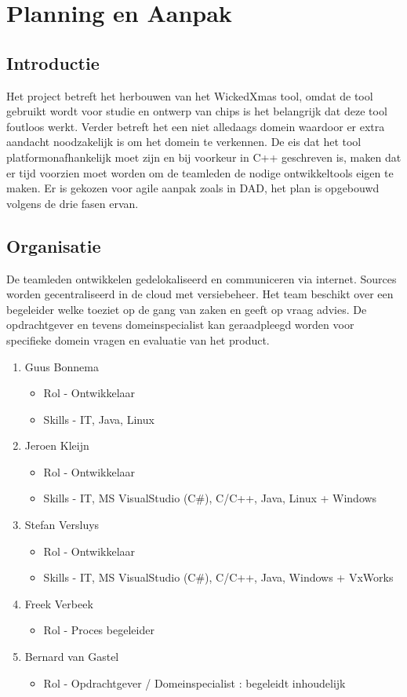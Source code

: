 
\section{Planning en Aanpak}
\subsection{Introductie}
Het project betreft het herbouwen van het WickedXmas tool, omdat de tool gebruikt wordt voor studie
en ontwerp van chips is het belangrijk dat deze tool foutloos werkt. Verder betreft het een niet
alledaags domein waardoor er extra aandacht noodzakelijk is om het domein te verkennen. De eis dat
het tool platformonafhankelijk moet zijn en bij voorkeur in C++ geschreven is,  maken dat er tijd
voorzien moet worden om de teamleden de nodige ontwikkeltools eigen te maken.
Er is gekozen voor agile aanpak zoals in DAD, het plan is opgebouwd volgens de
drie fasen ervan.

\subsection{Organisatie}
 De teamleden ontwikkelen gedelokaliseerd en communiceren via internet. Sources worden gecentraliseerd
 in de cloud met versiebeheer. Het team beschikt over een begeleider welke toeziet op de gang van zaken
 en geeft op vraag advies. De opdrachtgever en tevens domeinspecialist kan geraadpleegd worden voor
 specifieke domein vragen en evaluatie van het product.
 \begin{enumerate}
 	\item Guus Bonnema
 	\begin{itemize}
		\item Rol - Ontwikkelaar
		\item Skills - IT, Java, Linux
	\end{itemize}
 	\item Jeroen Kleijn
 	\begin{itemize}
		\item Rol - Ontwikkelaar
		\item Skills - IT,  MS VisualStudio (C\#), C/C++, Java, Linux + Windows
	\end{itemize}
 	\item Stefan Versluys
 	\begin{itemize}
		\item Rol - Ontwikkelaar
		\item Skills - IT,  MS VisualStudio (C\#), C/C++, Java, Windows + VxWorks
	\end{itemize}
	\item Freek Verbeek
	\begin{itemize}
		\item Rol - Proces begeleider
	\end{itemize}
	\item Bernard van Gastel
	\begin{itemize}
		\item Rol - Opdrachtgever / Domeinspecialist : begeleidt inhoudelijk
	\end{itemize}

 \end{enumerate}

